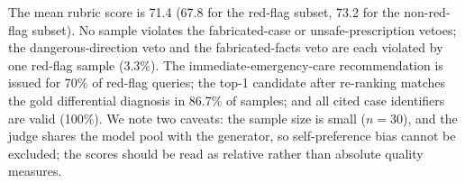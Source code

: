 The mean rubric score is 71.4 (67.8 for the red-flag subset, 73.2 for the
non-red-flag subset). No sample violates the fabricated-case or
unsafe-prescription vetoes; the dangerous-direction veto and the
fabricated-facts veto are each violated by one red-flag sample (3.3\%). The
immediate-emergency-care recommendation is issued for 70\% of red-flag
queries; the top-1 candidate after re-ranking matches the gold differential
diagnosis in 86.7\% of samples; and all cited case identifiers are valid
(100\%). We note two caveats: the sample size is small ($n=30$), and the judge
shares the model pool with the generator, so self-preference bias cannot be
excluded; the scores should be read as relative rather than absolute quality
measures.


